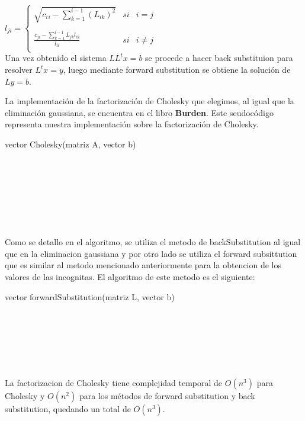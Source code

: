 $l_{ji} =
\left\{
    \begin{array}{lcc}
        \sqrt{c{_i}{_i} - \sum\limits_{k=1}^{i-1} (L_{ik})^2} & si & i = j \\
        \\ \frac{c_{ji} - \sum\limits_{k=1}^{i-1} L_{jk}l_{ik}}{l_{ii}} & si & i \neq j \\
    \end{array}
\right.$ \\

Una vez obtenido el sistema $LL^tx=b$ se procede a hacer back substituion para resolver $L^tx=y$, luego mediante forward substitution se obtiene la solución de $Ly=b$.

La implementación de la factorización de Cholesky que elegimos, al igual que la eliminación gaussiana, se encuentra en el libro \textbf{Burden}.
Este seudocódigo representa nuestra implementación sobre la factorización de Cholesky.

\begin{algorithm}
    \begin{algorithmic}[1]\parskip=2mm
        \caption{vector Cholesky(matriz A, vector b)}
        \\
        \\
        \\
        \\
        \\
        \\
    \end{algorithmic}
\end{algorithm}

Como se detallo en el algoritmo, se utiliza el metodo de backSubstitution al igual que en la eliminacion gaussiana y por otro lado se utiliza el forward subsittution que es similar al metodo mencionado anteriormente para la obtencion de los valores de las incognitas.
El algoritmo de este metodo es el siguiente:
\begin{algorithm}
    \begin{algorithmic}[1]\parskip=2mm
        \caption{vector forwardSubstitution(matriz L, vector b)}
        \\ 
        \\
        \\
        \\
        \\
      \end{algorithmic}
\end{algorithm}

La factorizacion de Cholesky tiene complejidad temporal de $O(n^3)$ para Cholesky y $O(n^2)$ para los métodos de forward substitution y back substitution, quedando un total de $O(n^3)$.

\newpage
